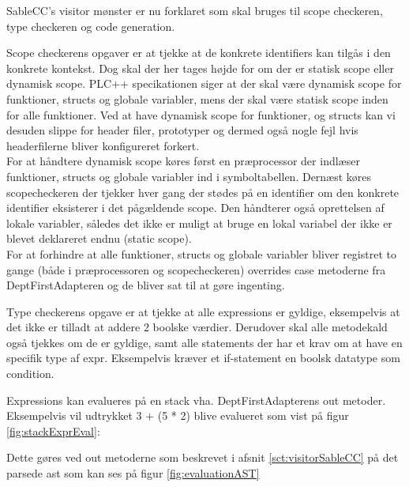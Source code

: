 
\noindent SableCC's visitor mønster er nu forklaret som skal bruges til scope checkeren, type checkeren og code generation.

Scope checkerens opgaver er at tjekke at de konkrete identifiers kan tilgås i den konkrete kontekst. Dog skal der her tages højde for om der er statisk scope eller dynamisk scope. PLC++ specikationen siger at der skal være dynamisk scope for funktioner, structs og globale variabler, mens der skal være statisk scope inden for alle funktioner. Ved at have dynamisk scope for funktioner, og structs kan vi desuden slippe for header filer, prototyper og dermed også nogle fejl hvis headerfilerne bliver konfigureret forkert.\\

\noindent For at håndtere dynamisk scope køres først en præprocessor der indlæser funktioner, structs og globale variabler ind i symboltabellen. Dernæst køres scopecheckeren der tjekker hver gang der stødes på en identifier om den konkrete identifier eksisterer i det pågældende scope. Den håndterer også oprettelsen af lokale variabler, således det ikke er muligt at bruge en lokal variabel der ikke er blevet deklareret endnu (static scope).\\

\noindent For at forhindre at alle funktioner, structs og globale variabler bliver registret to gange (både i præprocessoren og scopecheckeren) overrides case metoderne fra DeptFirstAdapteren og de bliver sat til at gøre ingenting.

Type checkerens opgave er at tjekke at alle expressions er gyldige, eksempelvis at det ikke er tilladt at addere 2 boolske værdier. Derudover skal alle metodekald også tjekkes om de er gyldige, samt alle statements der har et krav om at have en specifik type af expr. Eksempelvis kræver et if-statement en boolsk datatype som condition.

Expressions kan evalueres på en stack vha. DeptFirstAdapterens out metoder. Eksempelvis vil udtrykket 3 + (5 * 2) blive evalueret som vist på figur \ref{fig:stackExprEval}:


\noindent Dette gøres ved out metoderne som beskrevet i afsnit \ref{sct:visitorSableCC} på det parsede \gls{ast} som kan ses på figur \ref{fig:evaluationAST}

